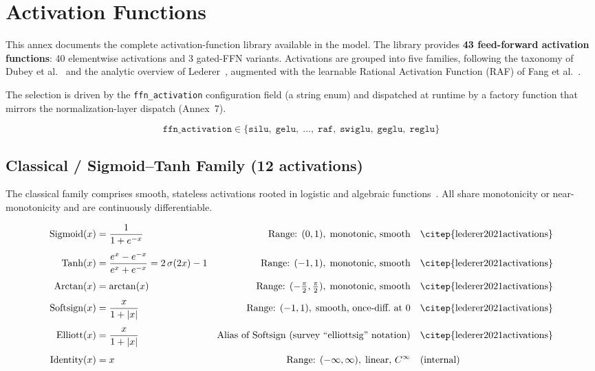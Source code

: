 \section{Activation Functions}
\label{sec:annex-activation-functions}

This annex documents the complete activation-function library available in the
model. The library provides \textbf{43 feed-forward activation functions}: 40
elementwise activations and 3 gated-FFN variants. Activations are grouped into
five families, following the taxonomy of Dubey et al.~\citep{dubey2021activations}
and the analytic overview of Lederer~\citep{lederer2021activations}, augmented
with the learnable Rational Activation Function (RAF) of
Fang et al.~\citep{fang2023raft}.

The selection is driven by the \texttt{ffn\_activation} configuration field (a
string enum) and dispatched at runtime by a factory function that mirrors the
normalization-layer dispatch (Annex~7).

\[
\texttt{ffn\_activation} \in \{\texttt{silu},\;\texttt{gelu},\;\dots,\;
\texttt{raf},\;\texttt{swiglu},\;\texttt{geglu},\;\texttt{reglu}\}
\]

\subsection{Classical / Sigmoid--Tanh Family (12 activations)}

The classical family comprises smooth, stateless activations rooted in
logistic and algebraic functions~\citep{lederer2021activations,dubey2021activations}.
All share monotonicity or near-monotonicity and are continuously differentiable.

{\footnotesize
\begin{align}
  \text{Sigmoid}(x) &= \frac{1}{1+e^{-x}}
    & \text{Range: } (0,1),\;\text{monotonic, smooth}
    & \quad \text{\citep{lederer2021activations}} \\[4pt]
  \text{Tanh}(x) &= \frac{e^{x}-e^{-x}}{e^{x}+e^{-x}} = 2\,\sigma(2x)-1
    & \text{Range: } (-1,1),\;\text{monotonic, smooth}
    & \quad \text{\citep{lederer2021activations}} \\[4pt]
  \text{Arctan}(x) &= \arctan(x)
    & \text{Range: } (-\tfrac{\pi}{2},\tfrac{\pi}{2}),\;\text{monotonic, smooth}
    & \quad \text{\citep{lederer2021activations}} \\[4pt]
  \text{Softsign}(x) &= \frac{x}{1+|x|}
    & \text{Range: } (-1,1),\;\text{smooth, once-diff.\ at 0}
    & \quad \text{\citep{lederer2021activations}} \\[4pt]
  \text{Elliott}(x) &= \frac{x}{1+|x|}
    & \text{Alias of Softsign (survey ``elliottsig'' notation)}
    & \quad \text{\citep{lederer2021activations}} \\[4pt]
  \text{Identity}(x) &= x
    & \text{Range: } (-\infty,\infty),\;\text{linear, }C^\infty
    & \quad \text{(internal)}
\end{align}
}  %


